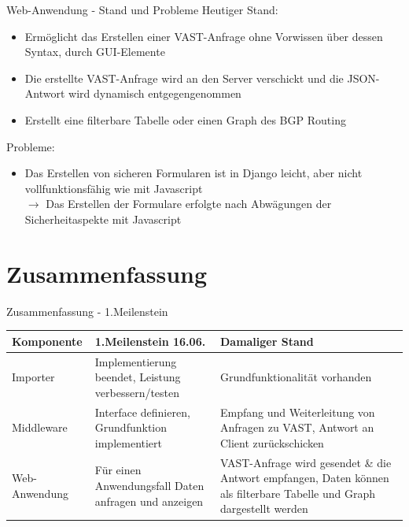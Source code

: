 \documentclass[9pt]{beamer}
\begin{document}
\begin{frame}{Web-Anwendung - Stand und Probleme}
	Heutiger Stand:
	\begin{itemize}
		\item Ermöglicht das Erstellen einer VAST-Anfrage ohne Vorwissen über dessen Syntax, durch GUI-Elemente 
		\item Die erstellte VAST-Anfrage wird an den Server verschickt und  die JSON-Antwort wird dynamisch entgegengenommen 
		\item Erstellt eine filterbare Tabelle oder einen Graph des BGP Routing
	\end{itemize}
	Probleme:
	\begin{itemize}
		\item Das Erstellen von sicheren Formularen ist in Django leicht, aber nicht vollfunktionsfähig wie mit Javascript \\
		$\rightarrow$ Das Erstellen der Formulare erfolgte nach Abwägungen der Sicherheitaspekte mit Javascript
	\end{itemize}
\end{frame}

\section{Zusammenfassung	}

\begin{frame}{Zusammenfassung - 1.Meilenstein}

	\begin{table}[h!]
	\centering
	\begin{tabular}{p{5em} p{12em} p{14em}}
		\textbf{Komponente} & \textbf{1.Meilenstein 16.06.} & \textbf{Damaliger Stand} \\ \midrule
		Importer & Implementierung beendet, Leistung verbessern/testen &  Grundfunktionalität vorhanden\\ \midrule
		Middleware & Interface definieren, Grundfunktion implementiert & Empfang und Weiterleitung von Anfragen zu VAST, Antwort an Client zurückschicken \\ \midrule
		Web-Anwendung & Für einen Anwendungsfall Daten anfragen und anzeigen & VAST-Anfrage wird gesendet \& die Antwort empfangen, Daten können als filterbare Tabelle und Graph dargestellt werden \\ \bottomrule
	\end{tabular}
	\end{table}
\end{frame}
\end{document}
